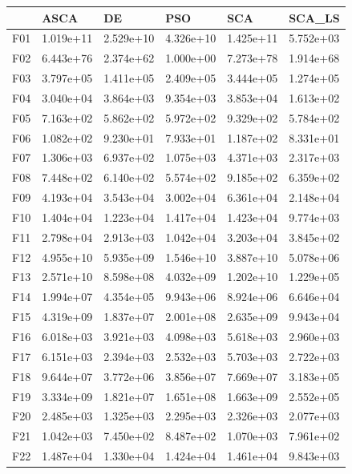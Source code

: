 \begin{tabular}{llllll}
\toprule
{} &       ASCA &         DE &        PSO &        SCA &     SCA\_LS \\
\midrule
F01  &  1.019e+11 &  2.529e+10 &  4.326e+10 &  1.425e+11 &  5.752e+03 \\
F02  &  6.443e+76 &  2.374e+62 &  1.000e+00 &  7.273e+78 &  1.914e+68 \\
F03  &  3.797e+05 &  1.411e+05 &  2.409e+05 &  3.444e+05 &  1.274e+05 \\
F04  &  3.040e+04 &  3.864e+03 &  9.354e+03 &  3.853e+04 &  1.613e+02 \\
F05  &  7.163e+02 &  5.862e+02 &  5.972e+02 &  9.329e+02 &  5.784e+02 \\
F06  &  1.082e+02 &  9.230e+01 &  7.933e+01 &  1.187e+02 &  8.331e+01 \\
F07  &  1.306e+03 &  6.937e+02 &  1.075e+03 &  4.371e+03 &  2.317e+03 \\
F08  &  7.448e+02 &  6.140e+02 &  5.574e+02 &  9.185e+02 &  6.359e+02 \\
F09  &  4.193e+04 &  3.543e+04 &  3.002e+04 &  6.361e+04 &  2.148e+04 \\
F10  &  1.404e+04 &  1.223e+04 &  1.417e+04 &  1.423e+04 &  9.774e+03 \\
F11  &  2.798e+04 &  2.913e+03 &  1.042e+04 &  3.203e+04 &  3.845e+02 \\
F12  &  4.955e+10 &  5.935e+09 &  1.546e+10 &  3.887e+10 &  5.078e+06 \\
F13  &  2.571e+10 &  8.598e+08 &  4.032e+09 &  1.202e+10 &  1.229e+05 \\
F14  &  1.994e+07 &  4.354e+05 &  9.943e+06 &  8.924e+06 &  6.646e+04 \\
F15  &  4.319e+09 &  1.837e+07 &  2.001e+08 &  2.635e+09 &  9.943e+04 \\
F16  &  6.018e+03 &  3.921e+03 &  4.098e+03 &  5.618e+03 &  2.960e+03 \\
F17  &  6.151e+03 &  2.394e+03 &  2.532e+03 &  5.703e+03 &  2.722e+03 \\
F18  &  9.644e+07 &  3.772e+06 &  3.856e+07 &  7.669e+07 &  3.183e+05 \\
F19  &  3.334e+09 &  1.821e+07 &  1.651e+08 &  1.663e+09 &  2.552e+05 \\
F20  &  2.485e+03 &  1.325e+03 &  2.295e+03 &  2.326e+03 &  2.077e+03 \\
F21  &  1.042e+03 &  7.450e+02 &  8.487e+02 &  1.070e+03 &  7.961e+02 \\
F22  &  1.487e+04 &  1.330e+04 &  1.424e+04 &  1.461e+04 &  9.843e+03 \\

\end{tabular}
